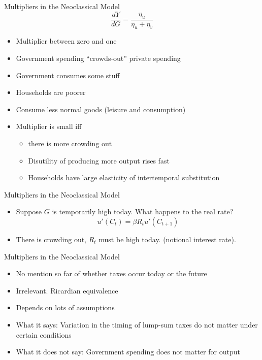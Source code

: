 \documentclass[english,xcolor=svgnames]{beamer}
\begin{document}
\begin{frame}{Multipliers in the Neoclassical Model}
$$\frac{dY}{dG} = \frac{\eta_u}{\eta_u + \eta_{\tilde{v}}}$$
\begin{itemize}
\item Multiplier between zero and one
\item Government spending ``crowds-out'' private spending
\item Government consumes some stuff
\item Households are poorer
\item Consume less normal goods (leisure and consumption)
\item Multiplier is small iff
\begin{itemize}
\item there is more crowding out
\item Disutility of producing more output rises fast
\item Households have large elasticity of intertemporal substitution
\end{itemize}
\end{itemize}
\end{frame}

\begin{frame}{Multipliers in the Neoclassical Model}
\begin{itemize}
\item Suppose $G$ is temporarily high today. What happens to the real rate?
$$u'(C_t) = \beta R_t u'(C_{t+1})$$
\item There is crowding out, $R_t$ must be high today. (notional interest rate).
\end{itemize}
\end{frame}

\begin{frame}{Multipliers in the Neoclassical Model}
\begin{itemize}
\item No mention so far of whether taxes occur today or the future
\item Irrelevant. Ricardian equivalence
\item Depends on lots of assumptions
\item What it says:
Variation in the timing of lump-sum taxes do not matter under certain conditions
\item What it does not say:
Government spending does not matter for output
\end{itemize}
\end{frame}
\end{document}
